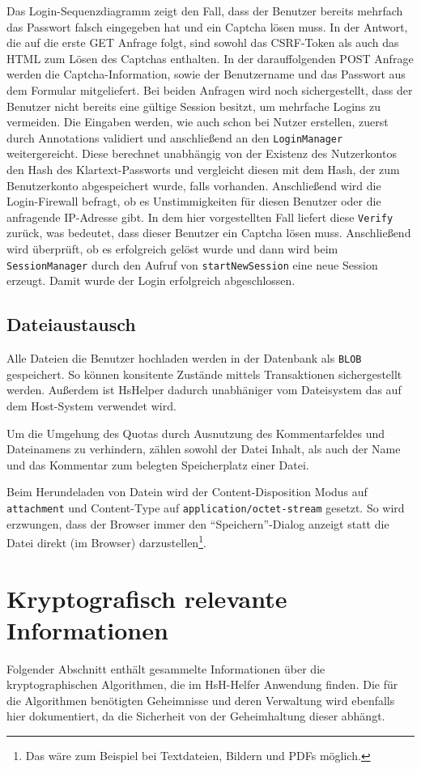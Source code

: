 \documentclass[12pt,DIV14,BCOR10mm,a4paper,parskip=half-,headsepline,headinclude,english,ngerman,bibliography=totocnumbered]{scrreprt}
\begin{document}
Das Login-Sequenzdiagramm zeigt den Fall, dass der Benutzer bereits mehrfach das Passwort falsch eingegeben hat und ein Captcha lösen muss. In der Antwort, die auf die erste GET Anfrage folgt, sind sowohl das CSRF-Token als auch das HTML zum Lösen des Captchas enthalten. In der darauffolgenden POST Anfrage werden die Captcha-Information, sowie der Benutzername und das Passwort aus dem Formular mitgeliefert. Bei beiden Anfragen wird noch sichergestellt, dass der Benutzer nicht bereits eine gültige Session besitzt, um mehrfache Logins zu vermeiden. Die Eingaben werden, wie auch schon bei Nutzer erstellen, zuerst durch Annotations validiert und anschließend an den \texttt{LoginManager} weitergereicht. Diese berechnet unabhängig von der Existenz des Nutzerkontos den Hash des Klartext-Passworts und vergleicht diesen mit dem Hash, der zum Benutzerkonto abgespeichert wurde, falls vorhanden. Anschließend wird die Login-Firewall befragt, ob es Unstimmigkeiten für diesen Benutzer oder die anfragende IP-Adresse gibt. In dem hier vorgestellten Fall liefert diese \texttt{Verify} zurück, was bedeutet, dass dieser Benutzer ein Captcha lösen muss. Anschließend wird überprüft, ob es erfolgreich gelöst wurde und dann wird beim \texttt{SessionManager} durch den Aufruf von \texttt{startNewSession} eine neue Session erzeugt. Damit wurde der Login erfolgreich abgeschlossen.


\section{Dateiaustausch}
Alle Dateien die Benutzer hochladen werden in der Datenbank als \texttt{BLOB} gespeichert. So können konsitente Zustände mittels Transaktionen sichergestellt werden. Außerdem ist HsHelper dadurch unabhäniger vom Dateisystem das auf dem Host-System verwendet wird.

Um die Umgehung des Quotas durch Ausnutzung des Kommentarfeldes und Dateinamens zu verhindern, zählen sowohl der Datei Inhalt, als auch der Name und das Kommentar zum belegten Speicherplatz einer Datei.

Beim Herundeladen von Datein wird der Content-Disposition Modus auf \texttt{attachment} und Content-Type auf \texttt{application/octet-stream} gesetzt. So wird erzwungen, dass der Browser immer den \enquote{Speichern}-Dialog anzeigt statt die Datei direkt (im Browser) darzustellen\footnote{Das wäre zum Beispiel bei Textdateien, Bildern und PDFs möglich.}.

\chapter{Kryptografisch relevante Informationen}
Folgender Abschnitt enthält gesammelte Informationen über die kryptographischen Algorithmen, die im HsH-Helfer Anwendung finden. Die für die Algorithmen benötigten Geheimnisse und deren Verwaltung wird ebenfalls hier dokumentiert, da die Sicherheit von der Geheimhaltung dieser abhängt.
\end{document}
